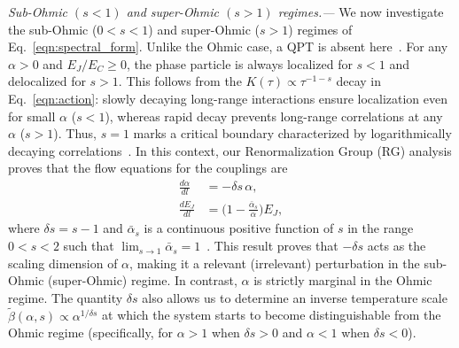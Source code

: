 \documentclass[aps,notitlepage,twocolumn,prl,nolongbibliography,superscriptaddress]{revtex4-2}
\begin{document}
\textit{Sub-Ohmic $(s<1)$ and super-Ohmic $(s>1)$ regimes.---}
We now investigate the sub-Ohmic ($0<s<1$) and super-Ohmic ($s>1$) regimes of Eq.~\eqref{eqn:spectral_form}. Unlike the Ohmic case, a QPT is absent here~\cite{Weiss_5th_edition, Fabrizio_subOhmic}. For any $\alpha>0$ and $E_J/E_C \geq 0$, the phase particle is always localized for $s<1$ and delocalized for $s>1$. This follows from the $K(\tau) \propto \tau^{-1-s}$ decay in Eq.~\eqref{eqn:action}: slowly decaying long-range interactions ensure localization even for small $\alpha$ ($s<1$), whereas rapid decay prevents long-range correlations at any $\alpha$ ($s>1$). Thus, $s=1$ marks a critical boundary characterized by logarithmically decaying correlations~\cite{EndMatterRef}. In this context, our Renormalization Group (RG) analysis proves that the flow equations for the couplings are
\begin{equation}
\begin{split}
    \frac{d \alpha}{dl} &= -\delta s \,\alpha,\\
    \frac{dE_J}{dl} &= \biggl(1-\frac{\bar{\alpha}_s}{ \alpha}\biggr)E_J,
\end{split}
\end{equation}
where $\delta s = s-1$ and ${\bar\alpha}_s$ is a continuous positive function of $s$ in the range $0<s<2$ such that $\lim_{s\to 1} {\bar \alpha}_s = 1$~\cite{SuppMatRef}. This result proves that $-\delta s$ acts as the scaling dimension of $\alpha$, making it a relevant (irrelevant) perturbation in the sub-Ohmic (super-Ohmic) regime. In contrast, $\alpha$ is strictly marginal in the Ohmic regime. The quantity $\delta s$ also allows us to determine an inverse temperature scale $\tilde{\beta}(\alpha, s) \propto \alpha^{1/\delta s}$ at which the system starts to become distinguishable from the Ohmic regime (specifically, for $\alpha>1$ when $\delta s>0$ and $\alpha<1$ when $\delta s<0$).
\end{document}
